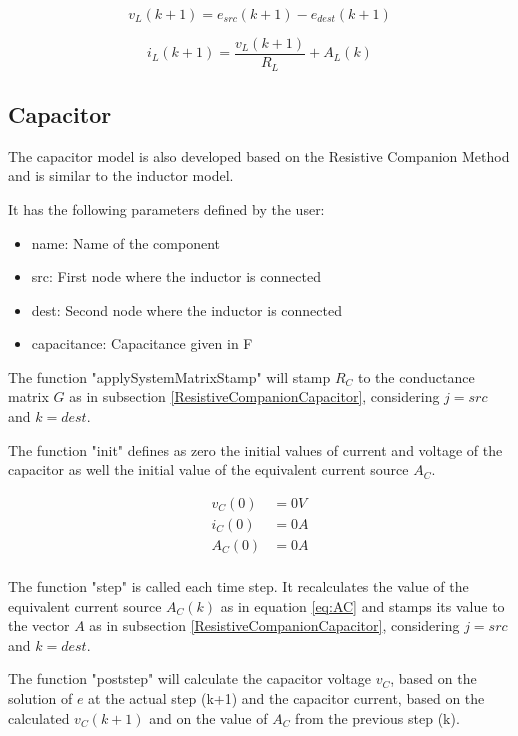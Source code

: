 \begin{equation} \label{eq:inductorVoltage}
v_L(k+1) = e_{src}(k+1) - e_{dest}(k+1)
\end{equation}

\begin{equation} \label{eq:inductorCurrent}
i_L(k+1) = \frac{v_L(k+1)}{R_L} + A_L(k)
\end{equation}
 

\subsection{Capacitor}

The capacitor model is also developed based on the Resistive Companion Method and is similar to the inductor model.

It has the following parameters defined by the user:

\begin{itemize}
\item name: Name of the component
\item src: First node where the inductor is connected
\item dest: Second node where the inductor is connected
\item capacitance: Capacitance given in F
\end{itemize}

The function "applySystemMatrixStamp" will stamp $R_C$ to the conductance matrix $G$ as in subsection \ref{ResistiveCompanionCapacitor}, considering $j=src$ and $k=dest$.

The function "init" defines as zero the initial values of current and voltage of the capacitor as well the initial value of the equivalent current source $A_C$.

\begin{align*}
v_C(0)&=0V \\
i_C(0)&=0A \\
A_C(0)&=0A \\
\end{align*}

The function "step" is called each time step. It recalculates the value of the equivalent current source $A_C(k)$ as in equation \ref{eq:AC} and stamps its value to the vector $A$ as in subsection \ref{ResistiveCompanionCapacitor}, considering $j=src$ and $k=dest$.

The function "poststep" will calculate the capacitor voltage $v_C$, based on the solution of $e$ at the actual step (k+1) and the capacitor current, based on the calculated $v_C(k+1)$ and on the value of $A_C$ from the previous step (k).

